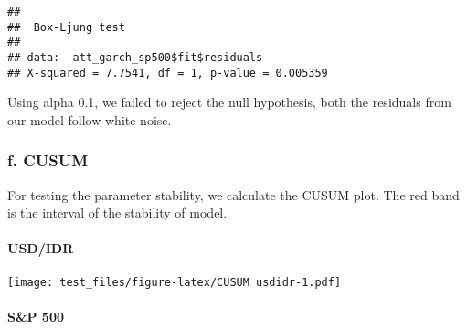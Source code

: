 \documentclass[]{article}
\newenvironment{Shaded}{\begin{snugshade}}{\end{snugshade}}
\newcommand{\KeywordTok}[1]{\textcolor[rgb]{0.13,0.29,0.53}{\textbf{#1}}}
\newcommand{\DataTypeTok}[1]{\textcolor[rgb]{0.13,0.29,0.53}{#1}}
\newcommand{\DecValTok}[1]{\textcolor[rgb]{0.00,0.00,0.81}{#1}}
\newcommand{\StringTok}[1]{\textcolor[rgb]{0.31,0.60,0.02}{#1}}
\newcommand{\OperatorTok}[1]{\textcolor[rgb]{0.81,0.36,0.00}{\textbf{#1}}}
\newcommand{\NormalTok}[1]{#1}
\let\oldparagraph\paragraph
\renewcommand{\paragraph}[1]{\oldparagraph{#1}\mbox{}}
\begin{document}
\begin{Shaded}
\end{Shaded}

\begin{verbatim}
## 
##  Box-Ljung test
## 
## data:  att_garch_sp500$fit$residuals
## X-squared = 7.7541, df = 1, p-value = 0.005359
\end{verbatim}

Using alpha 0.1, we failed to reject the null hypothesis, both the
residuals from our model follow white noise.

\subsubsection{f. CUSUM}\label{f.-cusum}

For testing the parameter stability, we calculate the CUSUM plot. The
red band is the interval of the stability of model.

\paragraph{USD/IDR}\label{usdidr}

\begin{Shaded}
\end{Shaded}

\texttt{[image: test\_files/figure-latex/CUSUM usdidr-1.pdf]}

\paragraph{S\&P 500}\label{sp-500}

\begin{Shaded}
\end{Shaded}
\end{document}

